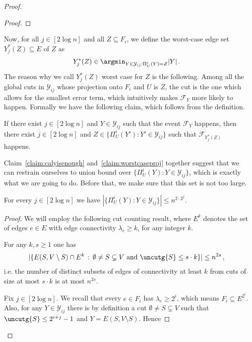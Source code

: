 \begin{proof}
\begin{proof}
\end{proof}
\noindent
Now, for all $j \in [2 \log n]$ and all $Z \subseteq F_i$, we define the worst-case edge set $Y^*_j(Z) \subseteq E$ of $Z$ as
\begin{equation*}
	Y^*_j(Z) \in \argmin_{Y \in \mathcal{Y}_{ij}: \Pi_U^i(Y) = Z}  |Y|\, .
\end{equation*}
The reason why we call $Y^*_j(Z)$ worst case for $Z$ is the following. Among all the global cuts in $\mathcal{Y}_{ij}$ whose projection onto $F_i$ and $U$ is $Z$,  the cut  is the one which allows for the smallest error term, which intuitively makes $\mathcal{F}_Y$ more likely to happen. Formally we have the following claim, which follows from the definition.

\begin{claim}
	\label{claim:worstcaseproj}
	If there exist $j \in [2\log n]$ and $Y \in \mathcal{Y}_{ij}$ such that the event $\mathcal{F}_{Y}$ happens, then there exist $j \in [2\log n]$ and $Z \in \{\Pi_U^i(Y'): Y' \in \mathcal{Y}_{ij}\}$ such that $\mathcal{F}_{Y_j^*(Z)}$ happens.
\end{claim}
\noindent
Claim~\ref{claim:calyisenough} and~\ref{claim:worstcaseproj} together suggest that we can restrain ourselves to union bound over $\{\Pi_U^i(Y): Y \in \mathcal{Y}_{ij}\}$, which is exactly what we are going to do. Before that, we make sure that this set is not too large.
\begin{claim}
	\label{claim:smallunionbound}
	For every $j \in [2\log n]$ we have $|\{\Pi_U^i(Y): Y \in \mathcal{Y}_{ij}\}| \le n^{2 \cdot 2^{j}}$.
\end{claim}
\begin{proof}
	We will employ the following cut counting result, where $E^k$ denotes the set of edges $e \in E$ with edge connectivity $\lambda_e \ge k$, for any integer $k$.
	\begin{theorem}\label{th:counting}
		For any $k, s \ge 1$ one has
		\begin{equation*}
			|\{E(S,V\setminus S) \cap E^k \, : \, \emptyset \neq S \subsetneq V \text{ and } \uncutg{S} \le s\cdot k\}| \le n^{2s} \, ,
		\end{equation*}
		i.e. the number of distinct subsets of edges of connectivity at least $k$ from cuts of size at most $s \cdot k$ is at most $n^{2s}$.
	\end{theorem}
	\noindent
	Fix $j \in [2\log n]$. We recall that every $e \in F_i$ has $\lambda_e \ge 2^i$, which means $F_i \subseteq E^{2^{i}}$. Also, for any $Y \in \mathcal{Y}_{ij}$ there is by definition a cut $\emptyset \neq S \subsetneq V$ such that $\uncutg{S} \le 2^{i+j}-1$ and $Y=E(S,V\setminus S)$. Hence

\end{proof}
\end{proof}
